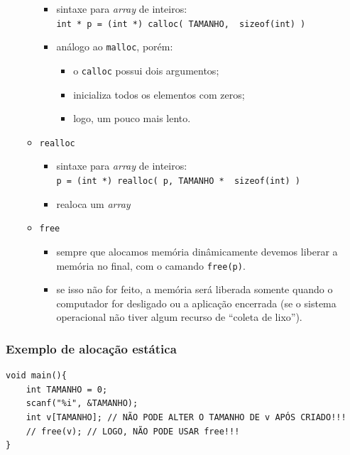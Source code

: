 \documentclass[12pt,a4paper]{article}
\providecommand{\tightlist}{%
      \setlength{\itemsep}{0pt}\setlength{\parskip}{0pt}}
\begin{document}
\begin{itemize}
\begin{itemize}
    \begin{itemize}
    \tightlist
    \item
      sintaxe para \emph{array} de inteiros:
      \texttt{int\ *\ p\ =\ (int\ *)\ calloc(\ TAMANHO,\ \ sizeof(int)\ )}
    \item
      análogo ao \texttt{malloc}, porém:

      \begin{itemize}
      \tightlist
      \item
        o \texttt{calloc} possui dois argumentos;
      \item
        inicializa todos os elementos com zeros;
      \item
        logo, um pouco mais lento.
      \end{itemize}
    \end{itemize}
  \item
    \texttt{realloc}

    \begin{itemize}
    \tightlist
    \item
      sintaxe para \emph{array} de inteiros:
      \texttt{p\ =\ (int\ *)\ realloc(\ p,\ TAMANHO\ *\ \ sizeof(int)\ )}
    \item
      realoca um \emph{array}
    \end{itemize}
  \item
    \texttt{free}

    \begin{itemize}
    \tightlist
    \item
      sempre que alocamos memória dinâmicamente devemos liberar a
      memória no final, com o camando \texttt{free(p)}.
    \item
      se isso não for feito, a memória será liberada somente quando o
      computador for desligado ou a aplicação encerrada (se o sistema
      operacional não tiver algum recurso de ``coleta de lixo'').
    \end{itemize}
  \end{itemize}
\end{itemize}

    \hypertarget{exemplo-de-alocauxe7uxe3o-estuxe1tica}{%
\subsubsection{Exemplo de alocação
estática}\label{exemplo-de-alocauxe7uxe3o-estuxe1tica}}

\begin{verbatim}
void main(){
    int TAMANHO = 0;
    scanf("%i", &TAMANHO);
    int v[TAMANHO]; // NÃO PODE ALTER O TAMANHO DE v APÓS CRIADO!!!
    // free(v); // LOGO, NÃO PODE USAR free!!!
}
\end{verbatim}
\end{document}
